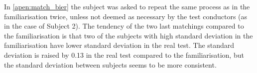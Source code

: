In \autoref{apen:match_bier} the subject was asked to repeat the same process as in the familiarisation twice, unless not deemed as necessary by the test conductors (as in the case of Subject 2). The tendency of the two last matchings compared to the familiarisation is that two of the subjects with high standard deviation in the familiarisation have lower standard deviation in the real test. The standard deviation is raised by 0.13 in the real test compared to the familiarisation, but the standard deviation between subjects seems to be more consistent. 





